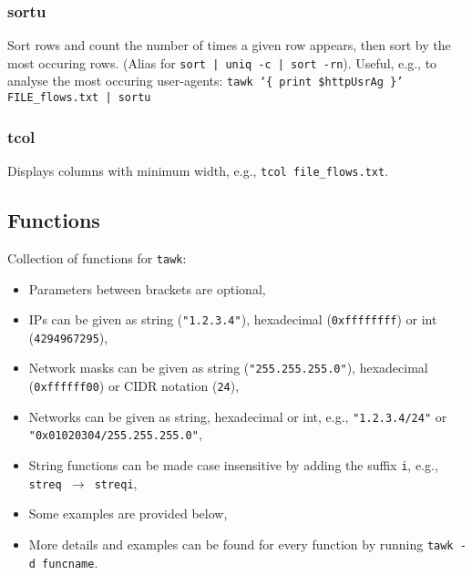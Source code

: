 \documentclass[documentation]{subfiles}
\begin{document}
\subsubsection{sortu}
Sort rows and count the number of times a given row appears, then sort by the most occuring rows.
(Alias for {\tt sort | uniq -c | sort -rn}).
Useful, e.g., to analyse the most occuring user-agents: {\tt tawk `\{ print \$httpUsrAg \}' FILE\_flows.txt | sortu}

\subsubsection{tcol}
Displays columns with minimum width, e.g., {\tt tcol file\_flows.txt}.

\subsection{Functions}\label{funcs}
Collection of functions for {\tt tawk}:
\begin{itemize}
    \item Parameters between brackets are optional,
    \item IPs can be given as string ({\tt "1.2.3.4"}), hexadecimal ({\tt 0xffffffff}) or int ({\tt 4294967295}),
    \item Network masks can be given as string ({\tt "255.255.255.0"}), hexadecimal ({\tt 0xffffff00}) or CIDR notation ({\tt 24}),
    \item Networks can be given as string, hexadecimal or int, e.g., {\tt "1.2.3.4/24"} or {\tt "0x01020304/255.255.255.0"},
    \item String functions can be made case insensitive by adding the suffix {\tt i}, e.g., {\tt streq $\rightarrow$ streqi},
    \item Some examples are provided below,
    \item More details and examples can be found for every function by running {\tt tawk -d funcname}.
\end{itemize}
\end{document}
